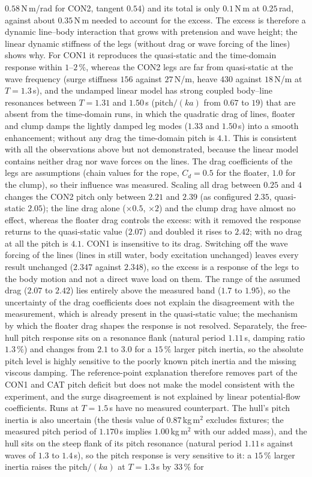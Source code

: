 \documentclass[11pt,a4paper]{article}
\begin{document}
$0.58$\,N\,m/rad for CON2, tangent $0.54$) and its total is only $0.1$\,N\,m at $0.25$\,rad, against about $0.35$\,N\,m needed to account for the excess. The excess is therefore a dynamic line--body interaction that grows with pretension and wave height; the linear dynamic stiffness of the legs (without drag or wave forcing of the lines) shows why. For CON1 it reproduces the quasi-static and the time-domain response within $1$--$2\,\%$, whereas the CON2 legs are far from quasi-static at the wave frequency (surge stiffness $156$ against $27$\,N/m, heave $430$ against $18$\,N/m at $T=1.3$\,s), and the undamped linear model has strong coupled body--line resonances between $T=1.31$ and $1.50$\,s (pitch$/(ka)$ from $0.67$ to $19$) that are absent from the time-domain runs, in which the quadratic drag of lines, floater and clump damps the lightly damped leg modes ($1.33$ and $1.50$\,s) into a smooth enhancement; without any drag the time-domain pitch is $4.1$. This is consistent with all the observations above but not demonstrated, because the linear model contains neither drag nor wave forces on the lines. The drag coefficients of the legs are assumptions (chain values for the rope, $C_d=0.5$ for the floater, $1.0$ for the clump), so their influence was measured. Scaling all drag between $0.25$ and $4$ changes the CON2 pitch only between $2.21$ and $2.39$ (as configured $2.35$, quasi-static $2.05$); the line drag alone ($\times0.5$, $\times2$) and the clump drag have almost no effect, whereas the floater drag controls the excess: with it removed the response returns to the quasi-static value ($2.07$) and doubled it rises to $2.42$; with no drag at all the pitch is $4.1$. CON1 is insensitive to its drag. Switching off the wave forcing of the lines (lines in still water, body excitation unchanged) leaves every result unchanged ($2.347$ against $2.348$), so the excess is a response of the legs to the body motion and not a direct wave load on them. The range of the assumed drag ($2.07$ to $2.42$) lies entirely above the measured band ($1.7$ to $1.95$), so the uncertainty of the drag coefficients does not explain the disagreement with the measurement, which is already present in the quasi-static value; the mechanism by which the floater drag shapes the response is not resolved. Separately, the free-hull pitch response sits on a resonance flank (natural period $1.11$\,s, damping ratio $1.3\,\%$) and changes from $2.1$ to $3.0$ for a $15\,\%$ larger pitch inertia, so the absolute pitch level is highly sensitive to the poorly known pitch inertia and the missing viscous damping. The reference-point explanation therefore removes part of the CON1 and CAT pitch deficit but does not make the model consistent with the experiment, and the surge disagreement is not explained by linear potential-flow coefficients. Runs at $T=1.5$\,s have no measured counterpart. The hull's pitch inertia is also uncertain (the thesis value of $0.87$\,kg\,m$^2$ excludes fixtures; the measured pitch period of $1.170$\,s implies $1.00$\,kg\,m$^2$ with our added mass), and the hull sits on the steep flank of its pitch resonance (natural period $1.11$\,s against waves of $1.3$ to $1.4$\,s), so the pitch response is very sensitive to it: a $15\,\%$ larger inertia raises the pitch$/(ka)$ at $T=1.3$\,s by $33\,\%$ for 
\end{document}
